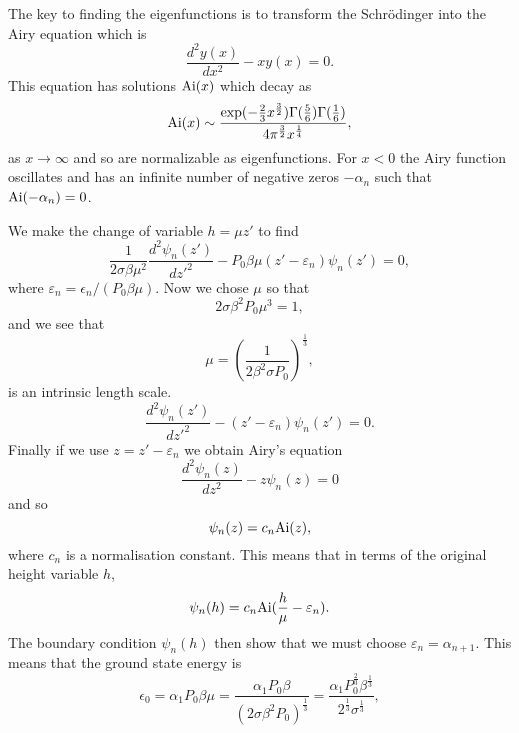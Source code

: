 The key to finding the eigenfunctions is to transform  the Schr\"odinger into the Airy equation which is
\begin{equation}
\frac{d^2y(x)}{dx^2}- x y(x)=0.
\end{equation}
This equation has solutions ${\rm Ai}(x)$ which decay as 
\begin{equation}
{\rm Ai}(x) \sim \frac{\exp(-\frac{2}{3} x^{\frac{3}{2}}) \Gamma(\frac{5}{6})\Gamma(\frac{1}{6})}{4\pi^{\frac{3}{2}} x^{\frac{1}{4}}},
\end{equation}
as $x\to\infty$ and so are normalizable as eigenfunctions. For $x<0$ the Airy function  oscillates and has an 
infinite number of negative zeros $-\alpha_n$ such that ${\rm Ai}(-\alpha_n)=0$. 

We make the change of variable $h=\mu z'$ to find
\begin{equation}
\frac{1}{2\sigma\beta\mu^2}\frac{d^2 \psi_n(z')}{dz'^2}- P_0\beta \mu(z'-\varepsilon_n)\psi_n(z')=0,
\end{equation}
where $\varepsilon_n= \epsilon_n/(P_0\beta\mu)$. Now  we chose $\mu$ so that
\begin{equation}
2\sigma\beta^2P_0 \mu^3=1,
\end{equation}
and we see that  
\begin{equation}
\mu = \left(\frac{1}{2\beta^2\sigma P_0}\right)^{\frac{1}{3}},
\end{equation}
is an intrinsic length scale.
\begin{equation}
\frac{d^2 \psi_n(z')}{dz'^2}- (z'-\varepsilon_n)\psi_n(z')=0.
\end{equation}
Finally if we use $z=z'-\varepsilon_n$ we obtain Airy's equation
\begin{equation}
\frac{d^2 \psi_n(z)}{dz^2}- z\psi_n(z)=0
\end{equation}
and so
\begin{equation}
\psi_n(z)= c_n {\rm Ai}(z),
\end{equation}
where $c_n$ is a normalisation constant. This means that in terms of the original height variable $h$, 
\begin{equation}
\psi_n(h)= c_n {\rm Ai}(\frac{h}{\mu}-\varepsilon_n).
\end{equation}
The boundary condition $\psi_n(h)$ then show that we must choose $\varepsilon_n=\alpha_{n+1}$. This means that the ground state energy is
\begin{equation}
\epsilon_0 = \alpha_1P_0\beta\mu= \frac{\alpha_1P_0\beta}{(2\sigma\beta^2P_0)^\frac{1}{3}}= \frac{\alpha_1 P_0^\frac{2}{3}\beta^\frac{1}{3}}{2^\frac{1}{3} \sigma^\frac{1}{3}},
\end{equation}
